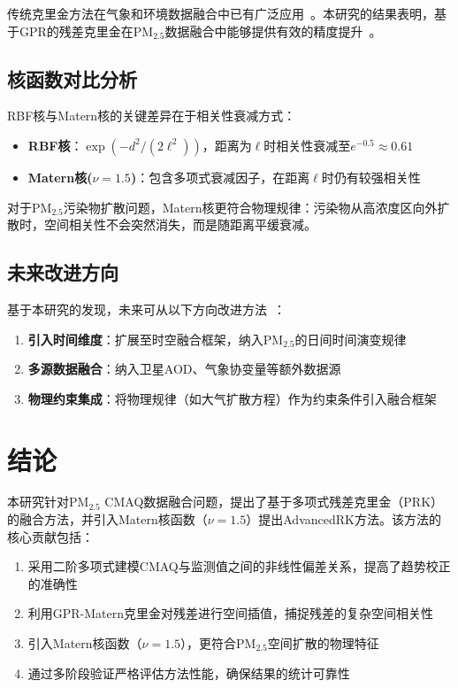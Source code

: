 \documentclass[UTF8, a4paper, 12pt]{article}
\begin{document}
传统克里金方法在气象和环境数据融合中已有广泛应用~\cite{cressman1959operational,cooley2007kriging}。本研究的结果表明，基于GPR的残差克里金在PM$_{2.5}$数据融合中能够提供有效的精度提升~\cite{zheng2020kriging}。

\subsection{核函数对比分析}

RBF核与Matern核的关键差异在于相关性衰减方式：

\begin{itemize}
    \item \textbf{RBF核}：$\exp(-d^2/(2\ell^2))$，距离为$\ell$时相关性衰减至$e^{-0.5}\approx 0.61$
    \item \textbf{Matern核($\nu=1.5$)}：包含多项式衰减因子，在距离$\ell$时仍有较强相关性
\end{itemize}

对于PM$_{2.5}$污染物扩散问题，Matern核更符合物理规律：污染物从高浓度区向外扩散时，空间相关性不会突然消失，而是随距离平缓衰减。

\subsection{未来改进方向}

基于本研究的发现，未来可从以下方向改进方法~\cite{wang2025spint}：

\begin{enumerate}
    \item \textbf{引入时间维度}：扩展至时空融合框架，纳入PM$_{2.5}$的日间时间演变规律

    \item \textbf{多源数据融合}：纳入卫星AOD、气象协变量等额外数据源

    \item \textbf{物理约束集成}：将物理规律（如大气扩散方程）作为约束条件引入融合框架
\end{enumerate}

\section{结论}

本研究针对PM$_{2.5}$ CMAQ数据融合问题，提出了基于多项式残差克里金（PRK）的融合方法，并引入Matern核函数（$\nu=1.5$）提出AdvancedRK方法。该方法的核心贡献包括：

\begin{enumerate}
    \item 采用二阶多项式建模CMAQ与监测值之间的非线性偏差关系，提高了趋势校正的准确性

    \item 利用GPR-Matern克里金对残差进行空间插值，捕捉残差的复杂空间相关性

    \item 引入Matern核函数（$\nu=1.5$），更符合PM$_{2.5}$空间扩散的物理特征

    \item 通过多阶段验证严格评估方法性能，确保结果的统计可靠性
\end{enumerate}
\end{document}

